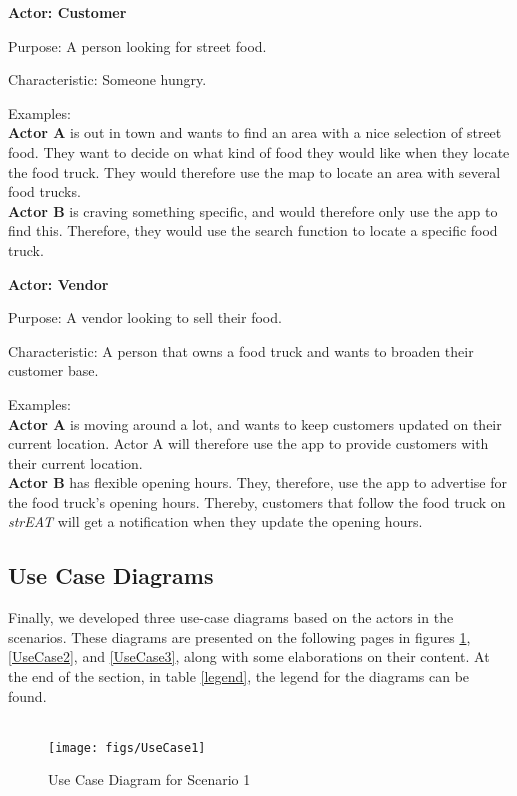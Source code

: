 \textbf{Actor: Customer}
\begin{description}
\item Purpose: A person looking for street food.
\item Characteristic: Someone hungry.
\item Examples:\\
\textbf{Actor A} is out in town and wants to find an area with a nice selection of street food. They want to decide on what kind of food they would like when they locate the food truck. They would therefore use the map to locate an area with several food trucks. \\
\textbf{Actor B} is craving something specific, and would therefore only use the app to find this. Therefore, they would use the search function to locate a specific food truck.
\end{description}
\textbf{Actor: Vendor}
\begin{description}
\item Purpose: A vendor looking to sell their food.
\item Characteristic: A person that owns a food truck and wants to broaden their customer base.
\item Examples:\\
\textbf{Actor A} is moving around a lot, and wants to keep customers updated on their current location. Actor A will therefore use the app to provide customers with their current location. \\
\textbf{Actor B} has flexible opening hours. They, therefore, use the app to advertise for the food truck’s opening hours. Thereby, customers that follow the food truck on \textit{strEAT} will get a notification when they update the opening hours.
\end{description}

\subsection{Use Case Diagrams}
Finally, we developed three use-case diagrams based on the actors in the scenarios. These diagrams are presented on the following pages in figures \ref{UseCase1}, \ref{UseCase2}, and \ref{UseCase3}, along with some elaborations on their content. At the end of the section, in table \ref{legend}, the legend for the diagrams can be found.\\ \\
\pagebreak

\begin{figure}[!h]
\centering
\texttt{[image: figs/UseCase1]}
\caption{Use Case Diagram for Scenario 1}
\label{UseCase1}
\end{figure}

